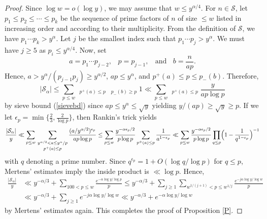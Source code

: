 \documentclass[12pt]{article}
\begin{document}
\begin{proof}
Since $\log w = o (\log y)$, we may assume that $w \le y^{\alpha / 4}$. For $n \in \mathcal{S}$, let $p_1 \le p_2 \le \cdots \le p_k$ be the sequence of prime factors of $n$ of size $\le w$ listed in increasing order and according to their multiplicity. From the definition of $\mathcal{S}$, we have $p_1 \cdots p_k > y^\alpha$. Let $j$ be the smallest index such that $p_1 \cdots p_j > y^\alpha$. We must have $j \ge 5$ as $p_i \le y^{\alpha / 4}$. Now, set
\[
a = p_1 \cdots p_{j-2}, \; \; \; p = p_{j-1}, \; \; \text{ and } \; \; b = \frac{n}{a p}.
\]
Hence, $a > y^\alpha /(p_{j-1} p_j) \ge y^{\alpha / 2}$, $a p \le y^\alpha$, and $p^+(a) \le p \le p_{-}(b)$. Therefore,
\begin{equation} \label{Scount}
| \mathcal{S}_\alpha | \le \sum_{p \le w} \, \mathop{\sum_{y^{\alpha / 2} < a \le y^\alpha / p}}_{p^+(a) \le p} \, \mathop{\sum_{x/(ap) < b \le (x + y) /(a p)}}_{p_{-}(b) \ge p} 1 \ll \sum_{p \le w} \, \mathop{\sum_{y^{\alpha / 2} < a \le y^\alpha / p}}_{p^+(a) \le p} \frac{y}{a p \log p}
\end{equation}
by sieve bound (\ref{sievebd}) since $a p \le y^{\alpha} \le \sqrt{y}$ yielding $y / (a p) \ge \sqrt{y} \ge p$. If we let $\epsilon_p = \min \{ \frac{2}{3}, \frac{2}{\log p} \}$, then Rankin's trick yields
\[
\frac{| \mathcal{S}_\alpha |}{y} \ll \sum_{p \le w} \, \mathop{\sum_{y^{\alpha / 2} < a \le y^\alpha / p}}_{p^+(a) \le p} \frac{(a / y^{\alpha / 2})^{\epsilon_p}}{a p \log p} \le \sum_{p \le w} \frac{y^{- \alpha \epsilon_p / 2}}{p \log p} \sum_{p^+(a) \le p} \frac{1}{a^{1 - \epsilon_p}} \ll \sum_{p \le w} \frac{y^{- \alpha \epsilon_p / 2}}{p \log p} \prod_{q \le p} \Bigl(1 - \frac{1}{q^{1 - \epsilon_p}} \Bigr)^{-1}
\]
with $q$ denoting a prime number. Since $q^{\epsilon_p} = 1 + O(\log q / \log p)$ for $q \le p$, Mertens' estimates imply the inside product is $\ll \log p$. Hence,
\begin{align*}
\frac{| \mathcal{S}_\alpha |}{y} &\ll y^{- \alpha / 3} + \sum_{100 < p \le w} \frac{e^{- \alpha \log y / \log p}}{p} \le y^{- \alpha / 3} + \sum_{j \ge 1} \sum_{w^{1 / (j+1)} < p \le w^{1 / j}} \frac{e^{- j \alpha \log y / \log w}}{p} \\
&\ll y^{-\alpha / 3} + \sum_{j \ge 1} e^{- j \alpha \log y / \log w} \ll y^{-\alpha / 3} + e^{- \alpha \log y / \log w}
\end{align*}
by Mertens' estimates again. This completes the proof of Proposition \ref{P}.
\end{proof}
\end{document}
